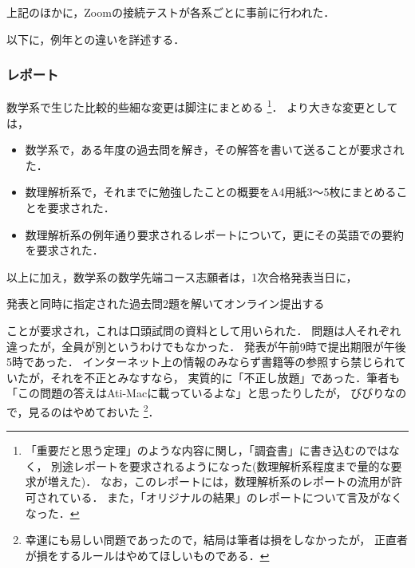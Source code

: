 \documentclass[uplatex]{jsarticle}
\begin{document}
上記のほかに，Zoomの接続テストが各系ごとに事前に行われた．

以下に，例年との違いを詳述する．
\subsubsection*{レポート}
数学系で生じた比較的些細な変更は脚注にまとめる
\footnote{
「重要だと思う定理」のような内容に関し，「調査書」に書き込むのではなく，
別途レポートを要求されるようになった(数理解析系程度まで量的な要求が増えた)．
なお，このレポートには，数理解析系のレポートの流用が許可されている．
また，「オリジナルの結果」のレポートについて言及がなくなった．}．
より大きな変更としては，
\begin{itemize}
	\item 数学系で，ある年度の過去問を解き，その解答を書いて送ることが要求された．
	\item 数理解析系で，それまでに勉強したことの概要をA4用紙3～5枚にまとめることを要求された．
	\item 数理解析系の例年通り要求されるレポートについて，更にその英語での要約を要求された．
\end{itemize}
以上に加え，数学系の数学先端コース志願者は，1次合格発表当日に，
\begin{center}
	発表と同時に指定された過去問2題を解いてオンライン提出する
\end{center}
ことが要求され，これは口頭試問の資料として用いられた．
問題は人それぞれ違ったが，全員が別というわけでもなかった．
発表が午前9時で提出期限が午後5時であった．
インターネット上の情報のみならず書籍等の参照すら禁じられていたが，それを不正とみなすなら，
実質的に「不正し放題」であった．筆者も「この問題の答えはAti-Macに載っているよな」と思ったりしたが，
びびりなので，見るのはやめておいた
\footnote{幸運にも易しい問題であったので，結局は筆者は損をしなかったが，
	正直者が損をするルールはやめてほしいものである．}．
\end{document}
